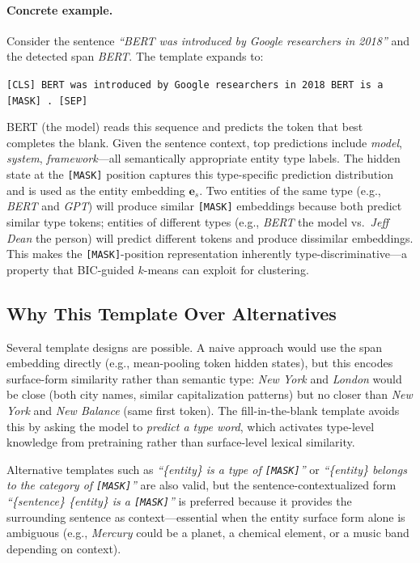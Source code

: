 \documentclass[14pt]{extreport}
\begin{document}
\paragraph{Concrete example.}
Consider the sentence \textit{``BERT was introduced by Google researchers in 2018''} and the detected span \textit{BERT}. The template expands to:
\begin{center}
\texttt{[CLS] BERT was introduced by Google researchers in 2018 BERT is a [MASK] . [SEP]}
\end{center}
BERT (the model) reads this sequence and predicts the token that best completes the blank. Given the sentence context, top predictions include \textit{model}, \textit{system}, \textit{framework}---all semantically appropriate entity type labels. The hidden state at the \texttt{[MASK]} position captures this type-specific prediction distribution and is used as the entity embedding $\mathbf{e}_s$. Two entities of the same type (e.g., \textit{BERT} and \textit{GPT}) will produce similar \texttt{[MASK]} embeddings because both predict similar type tokens; entities of different types (e.g., \textit{BERT} the model vs.\ \textit{Jeff Dean} the person) will predict different tokens and produce dissimilar embeddings. This makes the \texttt{[MASK]}-position representation inherently type-discriminative---a property that BIC-guided $k$-means can exploit for clustering.

\subsection{Why This Template Over Alternatives}

Several template designs are possible. A naive approach would use the span embedding directly (e.g., mean-pooling token hidden states), but this encodes surface-form similarity rather than semantic type: \textit{New York} and \textit{London} would be close (both city names, similar capitalization patterns) but no closer than \textit{New York} and \textit{New Balance} (same first token). The fill-in-the-blank template avoids this by asking the model to \emph{predict a type word}, which activates type-level knowledge from pretraining rather than surface-level lexical similarity.

Alternative templates such as \textit{``\{entity\} is a type of \texttt{[MASK]}''} or \textit{``\{entity\} belongs to the category of \texttt{[MASK]}''} are also valid, but the sentence-contextualized form \textit{``\{sentence\} \{entity\} is a \texttt{[MASK]}''} is preferred because it provides the surrounding sentence as context---essential when the entity surface form alone is ambiguous (e.g., \textit{Mercury} could be a planet, a chemical element, or a music band depending on context).
\end{document}
